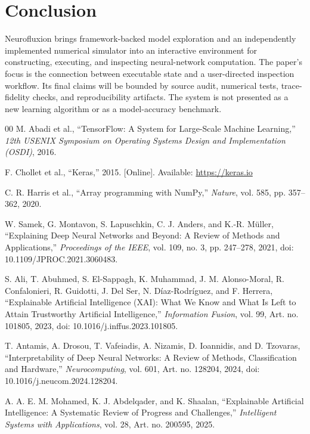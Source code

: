 \documentclass[conference]{IEEEtran}
\begin{document}
\section{Conclusion}
Neurofluxion brings framework-backed model exploration and an independently implemented numerical simulator into an interactive environment for constructing, executing, and inspecting neural-network computation. The paper's focus is the connection between executable state and a user-directed inspection workflow. Its final claims will be bounded by source audit, numerical tests, trace-fidelity checks, and reproducibility artifacts. The system is not presented as a new learning algorithm or as a model-accuracy benchmark.

\begin{thebibliography}{00}
M. Abadi et al., ``TensorFlow: A System for Large-Scale Machine Learning,''
\emph{12th USENIX Symposium on Operating Systems Design and Implementation (OSDI)}, 2016.

F. Chollet et al., ``Keras,'' 2015. [Online]. Available: \url{https://keras.io}

C. R. Harris et al., ``Array programming with NumPy,''
\emph{Nature}, vol. 585, pp. 357--362, 2020.

W. Samek, G. Montavon, S. Lapuschkin, C. J. Anders, and K.-R. Müller,
``Explaining Deep Neural Networks and Beyond: A Review of Methods and Applications,''
\emph{Proceedings of the IEEE}, vol. 109, no. 3, pp. 247--278, 2021, doi: 10.1109/JPROC.2021.3060483.

S. Ali, T. Abuhmed, S. El-Sappagh, K. Muhammad, J. M. Alonso-Moral, R. Confalonieri, R. Guidotti, J. Del Ser, N. Díaz-Rodríguez, and F. Herrera,
``Explainable Artificial Intelligence (XAI): What We Know and What Is Left to Attain Trustworthy Artificial Intelligence,''
\emph{Information Fusion}, vol. 99, Art. no. 101805, 2023, doi: 10.1016/j.inffus.2023.101805.

T. Antamis, A. Drosou, T. Vafeiadis, A. Nizamis, D. Ioannidis, and D. Tzovaras,
``Interpretability of Deep Neural Networks: A Review of Methods, Classification and Hardware,''
\emph{Neurocomputing}, vol. 601, Art. no. 128204, 2024, doi: 10.1016/j.neucom.2024.128204.

A. A. E. M. Mohamed, K. J. Abdelqader, and K. Shaalan,
``Explainable Artificial Intelligence: A Systematic Review of Progress and Challenges,''
\emph{Intelligent Systems with Applications}, vol. 28, Art. no. 200595, 2025.


\end{thebibliography}
\end{document}
